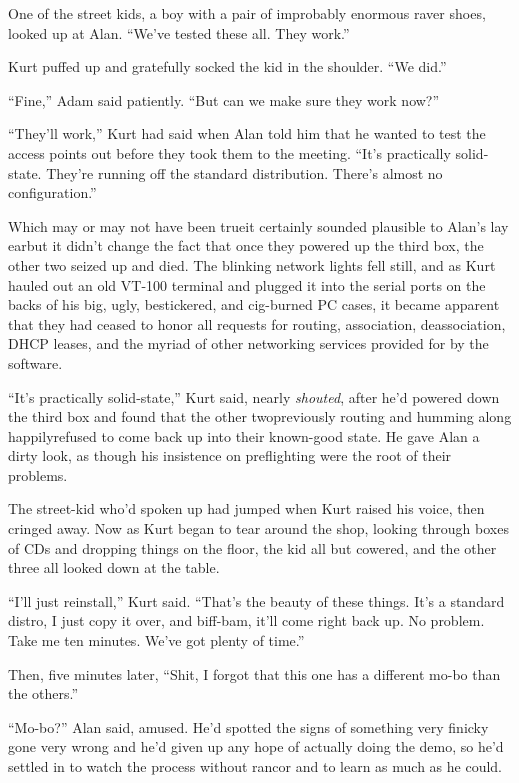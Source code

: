 One of the street kids, a boy with a pair of improbably enormous raver
shoes, looked up at Alan.  ``We've tested these all.  They work.''

Kurt puffed up and gratefully socked the kid in the shoulder.  ``We
did.''

``Fine,'' Adam said patiently.  ``But can we make sure they work
now?''

``They'll work,'' Kurt had said when Alan told him that he wanted to
test the access points out before they took them to the meeting. 
``It's practically solid-state.  They're running off the standard
distribution.  There's almost no configuration.''

Which may or may not have been true\dash{}it certainly sounded plausible
to Alan's lay ear\dash{}but it didn't change the fact that once they
powered up the third box, the other two seized up and died.  The
blinking network lights fell still, and as Kurt hauled out an old
VT-100 terminal and plugged it into the serial ports on the backs of
his big, ugly, bestickered, and cig-burned PC cases, it became
apparent that they had ceased to honor all requests for routing,
association, deassociation, DHCP leases, and the myriad of other
networking services provided for by the software.

``It's practically solid-state,'' Kurt said, nearly \textit{shouted},
after he'd powered down the third box and found that the other
two\dash{}previously routing and humming along happily\dash{}refused to come
back up into their known-good state.  He gave Alan a dirty look, as
though his insistence on preflighting were the root of their problems.

The street-kid who'd spoken up had jumped when Kurt raised his voice,
then cringed away.  Now as Kurt began to tear around the shop, looking
through boxes of CDs and dropping things on the floor, the kid all but
cowered, and the other three all looked down at the table.

``I'll just reinstall,'' Kurt said.  ``That's the beauty of these
things.  It's a standard distro, I just copy it over, and biff-bam,
it'll come right back up.  No problem.  Take me ten minutes.  We've
got plenty of time.''

Then, five minutes later, ``Shit, I forgot that this one has a
different mo-bo than the others.''

``Mo-bo?'' Alan said, amused.  He'd spotted the signs of something
very finicky gone very wrong and he'd given up any hope of actually
doing the demo, so he'd settled in to watch the process without rancor
and to learn as much as he could.

